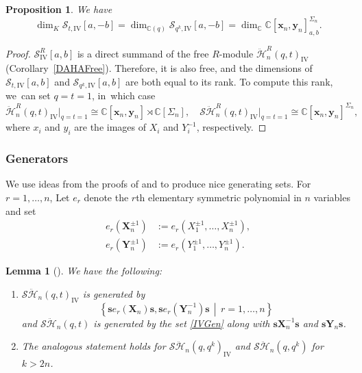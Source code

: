 \documentclass[11pt]{article}
\newtheorem{prop}[thm]{Proposition}
\newtheorem{lem}[thm]{Lemma}
\theoremstyle{definition}
\newcommand{\CC}{\mathbb{C}}
\newcommand{\SHH}{\mathcal{S}\ddot{\mathcal{H}}}
\newcommand{\HH}{\ddot{\mathcal{H}}}
\newcommand{\ee}{\boldsymbol{s}}
\begin{document}
\begin{prop}\label{IVRank}
We have
\[
\dim_{K}\mathcal{S}_{t,\mathrm{IV}}[a,-b]=\dim_{\CC(q)}\mathcal{S}_{q^k,\mathrm{IV}}[a,-b]=\dim_\CC \CC[\boldsymbol{x}_n,\boldsymbol{y}_n]^{\Sigma_n}_{a,b}.
\]
\end{prop}

\begin{proof}
$\mathcal{S}^R_{\mathrm{IV}}[a,b]$ is a direct summand of the free $R$-module $\HH_n^R(q,t)_{\mathrm{IV}}$ (Corollary~\ref{DAHAFree}).
Therefore, it is also free, and the dimensions of $\mathcal{S}_{t,\mathrm{IV}}[a,b]$ and $\mathcal{S}_{q^k,\mathrm{IV}}[a,b]$ are both equal to its rank.
To compute this rank, we~can set $q=t=1$, in~which case
\[
\HH_n^R(q,t)_{\mathrm{IV}}\big|_{q=t=1}\cong \CC[\boldsymbol{x}_n, \boldsymbol{y}_n]\rtimes\CC[\Sigma_n],\quad
\SHH_n^R(q,t)_{\mathrm{IV}}\big|_{q=t=1}\cong \CC[\boldsymbol{x}_n, \boldsymbol{y}_n]^{\Sigma_n},
\]
where $x_i$ and $y_i$ are the images of $X_i$ and $Y_i^{-1}$, respectively.
\end{proof}

\subsubsection{Generators}\label{Gen}
We use ideas from the proofs of \cite[Prop.\,2.5]{SchiffVassMac} and \cite[Lem.\,5.2]{FFJMM} to produce nice generating sets.
For $r=1,\ldots, n$, Let $e_r$ denote the $r$th elementary symmetric polynomial in $n$ variables and set
\begin{equation}
\begin{aligned}
e_r(\boldsymbol{X}_n^{\pm 1})&:=e_r(X_1^{\pm 1},\ldots, X_n^{\pm 1}),\\
e_r(\boldsymbol{Y}_n^{\pm 1})&:=e_r(Y_1^{\pm 1},\ldots, Y_n^{\pm 1}).
\end{aligned}
\label{ElemXY}
\end{equation}
\begin{lem}[{\cite[Lem.\,A.15.2]{VarVassRoot}}]\label{GenLem}
We have the following:
\begin{enumerate}
\item\label{GenLem1} $\SHH_n(q,t)_{\mathrm{IV}}$ is generated by
\begin{equation}
\left\{ \boldsymbol{s} e_r(\boldsymbol{X}_n)\boldsymbol{s},\boldsymbol{s} e_r(\boldsymbol{Y}_n^{-1})\boldsymbol{s}\, \middle|\, r=1,\ldots, n \right\}
\label{IVGen}
\end{equation}
and $\SHH_n(q,t)$ is generated by the set \eqref{IVGen} along with $\ee \boldsymbol{X}_n^{-1}\ee$ and $\ee \boldsymbol{Y}_n\ee$.
\item\label{GenLem2} The analogous statement holds for $\SHH_n(q,q^k)_{\mathrm{IV}}$ and $\SHH_n(q,q^k)$ for $k>2n$.
\end{enumerate}
\end{lem}
\end{document}
